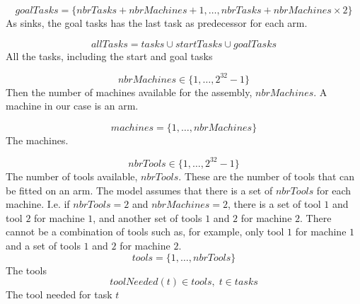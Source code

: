 \documentclass[10pt,a4paper]{report}
\begin{document}
\begin{equation}\label{eq:20}
goalTasks = \{nbrTasks+nbrMachines+1 , \ldots , nbrTasks+nbrMachines \times 2\}\end{equation}
As sinks, the goal tasks has the last task as predecessor for each arm.

\begin{equation}\label{eq:21}
allTasks = tasks \cup startTasks \cup goalTasks\end{equation}
All the tasks, including the start and goal tasks

\begin{equation}\label{eq:2}
nbrMachines \in \{1 , \ldots , 2^{32}-1\}
\end{equation}
Then the number of machines available for the assembly, $nbrMachines$. A machine in our case is an arm.

\begin{equation}\label{eq:11}
machines = \{1 , \ldots , nbrMachines\}\end{equation}
The machines.

\begin{equation}\label{eq:3}
nbrTools \in \{1 , \ldots , 2^{32}-1\}
\end{equation}
The number of tools available, $nbrTools$. These are the number of tools that can be fitted on an arm. The model assumes that there is a set of $nbrTools$ for each machine. I.e. if $nbrTools = 2$ and $nbrMachines = 2$, there is a set of tool $1$ and tool $2$ for machine $1$, and another set of tools $1$ and $2$ for machine $2$. There cannot be a combination of tools such as, for example, only tool $1$ for machine $1$ and a set of tools $1$ and $2$ for machine $2$.
\begin{equation}\label{eq:12}
tools = \{1 , \ldots , nbrTools\}\end{equation}
The tools
\begin{equation}\label{eq:33}
toolNeeded(t) \in tools, \; t \in tasks\end{equation} 
The tool needed for task $t$
\end{document}
